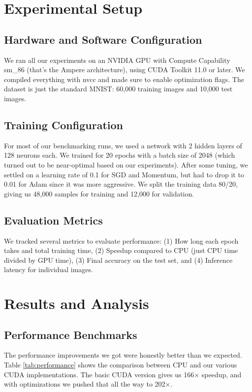 \documentclass[conference]{IEEEtran}
\begin{document}
\section{Experimental Setup}

\subsection{Hardware and Software Configuration}

We ran all our experiments on an NVIDIA GPU with Compute Capability sm\_86 (that's the Ampere architecture), using CUDA Toolkit 11.0 or later. We compiled everything with nvcc and made sure to enable optimization flags. The dataset is just the standard MNIST: 60,000 training images and 10,000 test images.

\subsection{Training Configuration}

For most of our benchmarking runs, we used a network with 2 hidden layers of 128 neurons each. We trained for 20 epochs with a batch size of 2048 (which turned out to be near-optimal based on our experiments). After some tuning, we settled on a learning rate of 0.1 for SGD and Momentum, but had to drop it to 0.01 for Adam since it was more aggressive. We split the training data 80/20, giving us 48,000 samples for training and 12,000 for validation.

\subsection{Evaluation Metrics}

We tracked several metrics to evaluate performance: (1) How long each epoch takes and total training time, (2) Speedup compared to CPU (just CPU time divided by GPU time), (3) Final accuracy on the test set, and (4) Inference latency for individual images.

\section{Results and Analysis}

\subsection{Performance Benchmarks}

The performance improvements we got were honestly better than we expected. Table \ref{tab:performance} shows the comparison between CPU and our various CUDA implementations. The basic CUDA version gives us 166× speedup, and with optimizations we pushed that all the way to 202×.
\end{document}
